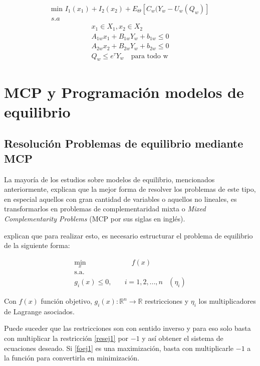 \begin{align}
 \text{min } I_{1}(x_{1})+ I_{2}(x_{2})+E_{\Theta}[C_{w}(Y_{w}-U_{w}(Q_{w})] \\
s.a
\end{align}
\begin{align}
 x_{1} \in X_{1} ,x_{2} \in X_{2}\\
A_{1w}x_{1}+B_{1w}Y_{w}+b_{1w} \le 0 \\
A_{2w}x_{2}+B_{2w}Y_{w}+b_{2w} \le 0 \\
Q_{w}\le e^{\tau}Y_{w}\text{  }\text{ para todo w}
\end{align}




\section{MCP y Programación modelos de equilibrio}

\subsection{Resolución Problemas de equilibrio mediante MCP}\label{descripcionkkt}

La mayoría de los estudios sobre modelos de equilibrio, mencionados anteriormente, explican que la mejor forma de resolver los problemas de este tipo, en especial aquellos con gran cantidad de variables o aquellos no lineales, es transformarlos en problemas de complementaridad mixta o \textit{Mixed Complementarity Problems} (MCP por sus siglas en inglés).
\vspace{2.5mm}

 explican que para realizar esto, es necesario estructurar el problema de equilibrio de la siguiente forma:

\begin{align}
    \min_{x} & \quad f(x) \label{foej1}\\ 
    \textrm{s.a.} \nonumber\\
    g_{i}(x) \leq 0 ,\quad & i=1,2,...,n  &(\eta_{i}) \label{resej1} 
\end{align}

Con $f(x)$ función objetivo,  $g_{i}(x):\mathbb{R}^n \rightarrow \mathbb{R}$ restricciones y $\eta_i$ los multiplicadores de Lagrange asociados. 
\vspace{2.5mm}

Puede suceder que las restricciones son con sentido inverso y para eso solo basta con multiplicar la restricción \ref{resej1} por $-1$ y así obtener el sistema de ecuaciones deseado. Si \ref{foej1} es una maximización, basta con multiplicarle $-1$ a la función para convertirla en minimización.
\vspace{2.5mm}

